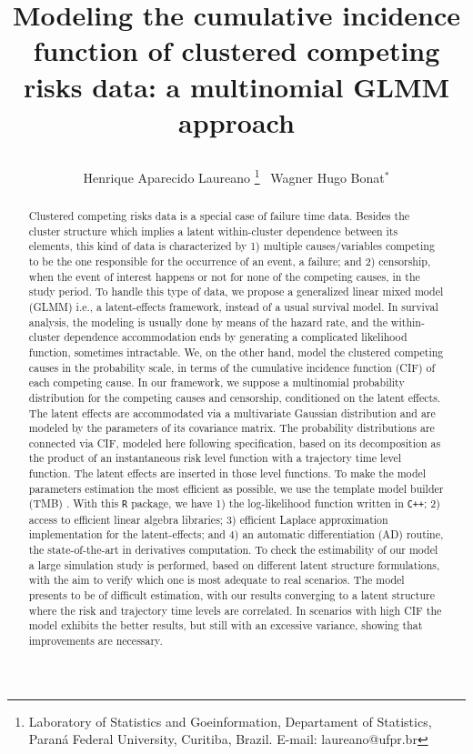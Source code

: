 \documentclass[a4paper,12pt]{article}
\title{
  
  Modeling the cumulative incidence function of clustered competing
  risks data: a multinomial GLMM approach

}
\author{
  Henrique Aparecido Laureano
  \thanks{Laboratory of Statistics and Goeinformation,
    Departament of Statistics,
    Paran\'{a} Federal University, Curitiba, Brazil.
    E-mail: laureano@ufpr.br
  }~
  Wagner Hugo Bonat$^\ast$}
\begin{document}
\maketitle
\medskip

\begin{abstract}

  Clustered competing risks data is a special case of failure time
  data. Besides the cluster structure which implies a latent
  within-cluster dependence between its elements, this kind of data is
  characterized by 1) multiple causes/variables competing to be the one
  responsible for the occurrence of an event, a failure; and 2)
  censorship, when the event of interest happens or not for none of the
  competing causes, in the study period. To handle this type of data, we
  propose a generalized linear mixed model (GLMM) i.e., a latent-effects
  framework, instead of a usual survival model. In survival analysis,
  the modeling is usually done by means of the hazard rate, and the
  within-cluster dependence accommodation ends by generating a
  complicated likelihood function, sometimes intractable. We, on the
  other hand, model the clustered competing causes in the probability
  scale, in terms of the cumulative incidence function (CIF) of each
  competing cause. In our framework, we suppose a multinomial
  probability distribution for the competing causes and censorship,
  conditioned on the latent effects. The latent effects are accommodated
  via a multivariate Gaussian distribution and are modeled by the
  parameters of its covariance matrix. The probability distributions are
  connected via CIF, modeled here following \citeonline{} specification,
  based on its decomposition as the product of an instantaneous risk
  level function with a trajectory time level function. The latent
  effects are inserted in those level functions. To make the model
  parameters estimation the most efficient as possible, we use the
  template model builder (TMB) \cite{}. With this \texttt{R} \cite{}
  package, we have 1) the log-likelihood function written in
  \texttt{C++}; 2) access to efficient linear algebra libraries; 3)
  efficient Laplace approximation implementation for the latent-effects;
  and 4) an automatic differentiation (AD) routine, the state-of-the-art
  in derivatives computation. To check the estimability of our model a
  large simulation study is performed, based on different latent
  structure formulations, with the aim to verify which one is most
  adequate to real scenarios. The model presents to be of difficult
  estimation, with our results converging to a latent structure where
  the risk and trajectory time levels are correlated. In scenarios with
  high CIF the model exhibits the better results, but still with an
  excessive variance, showing that improvements are necessary.

\end{abstract}
\end{document}
